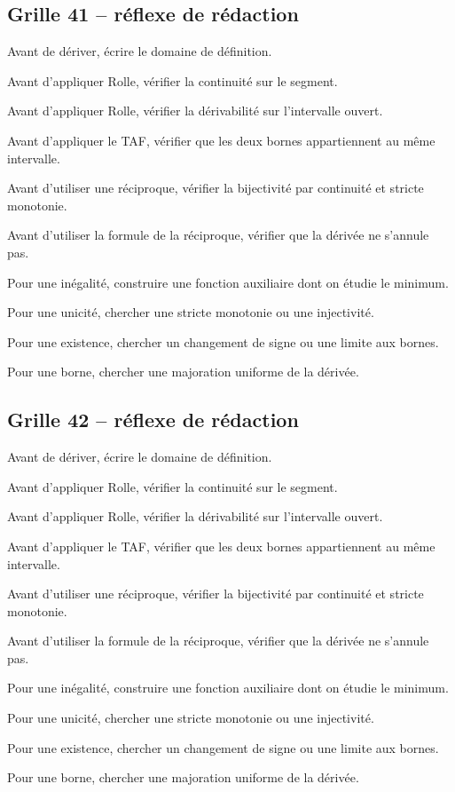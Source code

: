 \documentclass[11pt,a4paper]{article}
\begin{document}
\subsection*{Grille 41 -- réflexe de rédaction}

\begin{methodebox}

Avant de dériver, écrire le domaine de définition.

Avant d'appliquer Rolle, vérifier la continuité sur le segment.

Avant d'appliquer Rolle, vérifier la dérivabilité sur l'intervalle ouvert.

Avant d'appliquer le TAF, vérifier que les deux bornes appartiennent au même intervalle.

Avant d'utiliser une réciproque, vérifier la bijectivité par continuité et stricte monotonie.

Avant d'utiliser la formule de la réciproque, vérifier que la dérivée ne s'annule pas.

Pour une inégalité, construire une fonction auxiliaire dont on étudie le minimum.

Pour une unicité, chercher une stricte monotonie ou une injectivité.

Pour une existence, chercher un changement de signe ou une limite aux bornes.

Pour une borne, chercher une majoration uniforme de la dérivée.

\end{methodebox}

\subsection*{Grille 42 -- réflexe de rédaction}

\begin{methodebox}

Avant de dériver, écrire le domaine de définition.

Avant d'appliquer Rolle, vérifier la continuité sur le segment.

Avant d'appliquer Rolle, vérifier la dérivabilité sur l'intervalle ouvert.

Avant d'appliquer le TAF, vérifier que les deux bornes appartiennent au même intervalle.

Avant d'utiliser une réciproque, vérifier la bijectivité par continuité et stricte monotonie.

Avant d'utiliser la formule de la réciproque, vérifier que la dérivée ne s'annule pas.

Pour une inégalité, construire une fonction auxiliaire dont on étudie le minimum.

Pour une unicité, chercher une stricte monotonie ou une injectivité.

Pour une existence, chercher un changement de signe ou une limite aux bornes.

Pour une borne, chercher une majoration uniforme de la dérivée.

\end{methodebox}
\end{document}
